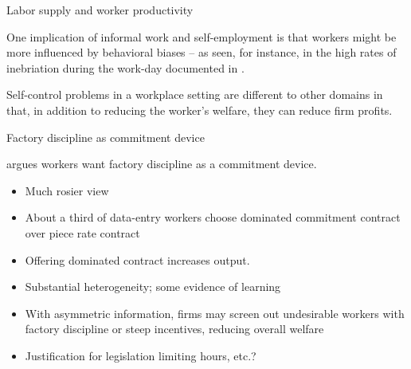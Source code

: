 \documentclass[aspectratio=169, 10pt, handout]{beamer}
\newenvironment{wideitemize}{\itemize\addtolength{\itemsep}{10pt}}{\enditemize}
\begin{document}
\begin{frame}{Labor supply and worker productivity}

\begin{wideitemize}

	\item One implication of informal work and self-employment is that workers might be more influenced by behavioral biases -- as seen, for instance, in the high rates of inebriation during the work-day documented in \cite{schilbach2015alcohol}.

	\item Self-control problems in a workplace setting are different to other domains in that, in addition to reducing the worker's welfare, they can reduce firm profits.

	
\end{wideitemize}

\end{frame}

\begin{frame}{Factory discipline as commitment device}

\begin{wideitemize}

	\item \cite{clark1994factory} argues workers want factory discipline as a commitment device.

	\begin{itemize}

		\item Much rosier view 

	\end{itemize}

	\item \cite{kaur2015self}

	\begin{itemize}

		\item About a third of data-entry workers choose dominated commitment contract over piece rate contract
		
		\item Offering dominated contract increases output.
		
		\item Substantial heterogeneity; some evidence of learning

		\item With asymmetric information, firms may screen out undesirable workers with factory discipline or steep incentives, reducing overall welfare

		\item Justification for legislation limiting hours, etc.?

	\end{itemize}
	
\end{wideitemize}

\end{frame}
\end{document}
